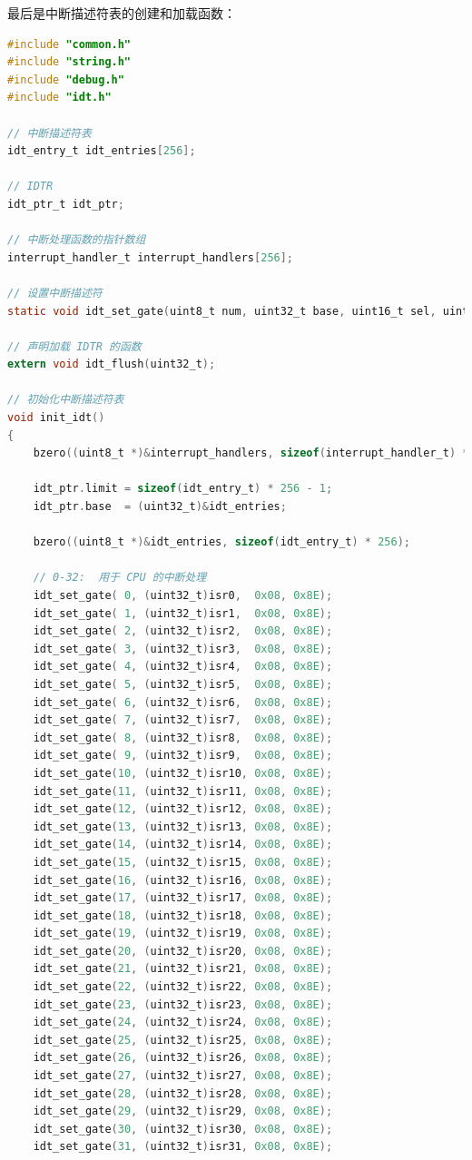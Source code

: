 \par 最后是中断描述符表的创建和加载函数：
\begin{lstlisting}[language = C, caption = idt/idt.c]
#include "common.h"
#include "string.h"
#include "debug.h"
#include "idt.h"

// 中断描述符表
idt_entry_t idt_entries[256];

// IDTR
idt_ptr_t idt_ptr;

// 中断处理函数的指针数组
interrupt_handler_t interrupt_handlers[256];

// 设置中断描述符
static void idt_set_gate(uint8_t num, uint32_t base, uint16_t sel, uint8_t flags);

// 声明加载 IDTR 的函数
extern void idt_flush(uint32_t);

// 初始化中断描述符表
void init_idt()
{	
	bzero((uint8_t *)&interrupt_handlers, sizeof(interrupt_handler_t) * 256);
	
	idt_ptr.limit = sizeof(idt_entry_t) * 256 - 1;
	idt_ptr.base  = (uint32_t)&idt_entries;
	
	bzero((uint8_t *)&idt_entries, sizeof(idt_entry_t) * 256);

	// 0-32:  用于 CPU 的中断处理
	idt_set_gate( 0, (uint32_t)isr0,  0x08, 0x8E);
	idt_set_gate( 1, (uint32_t)isr1,  0x08, 0x8E);
	idt_set_gate( 2, (uint32_t)isr2,  0x08, 0x8E);
	idt_set_gate( 3, (uint32_t)isr3,  0x08, 0x8E);
	idt_set_gate( 4, (uint32_t)isr4,  0x08, 0x8E);
	idt_set_gate( 5, (uint32_t)isr5,  0x08, 0x8E);
	idt_set_gate( 6, (uint32_t)isr6,  0x08, 0x8E);
	idt_set_gate( 7, (uint32_t)isr7,  0x08, 0x8E);
	idt_set_gate( 8, (uint32_t)isr8,  0x08, 0x8E);
	idt_set_gate( 9, (uint32_t)isr9,  0x08, 0x8E);
	idt_set_gate(10, (uint32_t)isr10, 0x08, 0x8E);
	idt_set_gate(11, (uint32_t)isr11, 0x08, 0x8E);
	idt_set_gate(12, (uint32_t)isr12, 0x08, 0x8E);
	idt_set_gate(13, (uint32_t)isr13, 0x08, 0x8E);
	idt_set_gate(14, (uint32_t)isr14, 0x08, 0x8E);
	idt_set_gate(15, (uint32_t)isr15, 0x08, 0x8E);
	idt_set_gate(16, (uint32_t)isr16, 0x08, 0x8E);
	idt_set_gate(17, (uint32_t)isr17, 0x08, 0x8E);
	idt_set_gate(18, (uint32_t)isr18, 0x08, 0x8E);
	idt_set_gate(19, (uint32_t)isr19, 0x08, 0x8E);
	idt_set_gate(20, (uint32_t)isr20, 0x08, 0x8E);
	idt_set_gate(21, (uint32_t)isr21, 0x08, 0x8E);
	idt_set_gate(22, (uint32_t)isr22, 0x08, 0x8E);
	idt_set_gate(23, (uint32_t)isr23, 0x08, 0x8E);
	idt_set_gate(24, (uint32_t)isr24, 0x08, 0x8E);
	idt_set_gate(25, (uint32_t)isr25, 0x08, 0x8E);
	idt_set_gate(26, (uint32_t)isr26, 0x08, 0x8E);
	idt_set_gate(27, (uint32_t)isr27, 0x08, 0x8E);
	idt_set_gate(28, (uint32_t)isr28, 0x08, 0x8E);
	idt_set_gate(29, (uint32_t)isr29, 0x08, 0x8E);
	idt_set_gate(30, (uint32_t)isr30, 0x08, 0x8E);
	idt_set_gate(31, (uint32_t)isr31, 0x08, 0x8E);


\end{lstlisting}
